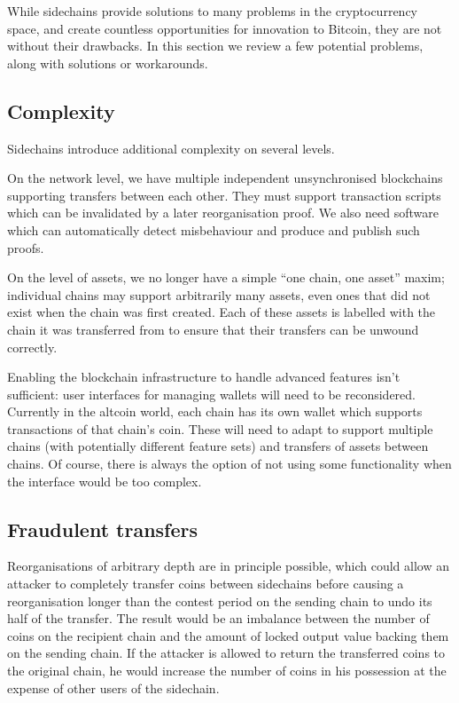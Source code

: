 \documentclass[letterpaper]{article}
\newcommand{\sidechains}{sidechains\xspace}
\newcommand{\altcoin}{altcoin\xspace}
\begin{document}
While \sidechains provide solutions to many problems in the cryptocurrency
space, and create countless opportunities for innovation to Bitcoin, they
are not without their drawbacks. In this section we review a few potential
problems, along with solutions or workarounds.

\subsection{Complexity}

Sidechains introduce additional complexity on several levels.

On the network level, we have
multiple independent unsynchronised blockchains supporting
transfers between each other. They must support transaction scripts
which can be invalidated by a later reorganisation proof. We
also need software which can automatically detect misbehaviour and produce
and publish such proofs.

On the level of assets, we no longer have a simple ``one chain, one asset''
maxim; individual chains may support arbitrarily many assets, even ones
that did not exist when the chain was first created. Each of these assets
is labelled with the chain it was transferred from to ensure
that their transfers can be unwound correctly.

Enabling the blockchain infrastructure to handle advanced features isn't sufficient: user interfaces for managing wallets will need to be reconsidered.
Currently in the \altcoin world, each chain has its own wallet which supports
transactions of that chain's coin. These will need to adapt to support
multiple chains (with potentially different feature sets) and transfers of assets
between chains. Of course, there is always the option of not using some functionality when the interface would be too complex.

\subsection{Fraudulent transfers\label{fraud}}

Reorganisations of arbitrary depth are in principle possible, which could allow
an attacker to completely transfer coins between \sidechains before causing
a reorganisation longer than the contest period on the sending chain to undo its half of the transfer. The result
would be an imbalance between the number of coins on the recipient chain and
the amount of locked output value backing them on the sending chain. If the
attacker is allowed to return the transferred coins to the original chain,
he would increase the number of coins in his possession at the expense
of other users of the sidechain.
\end{document}
